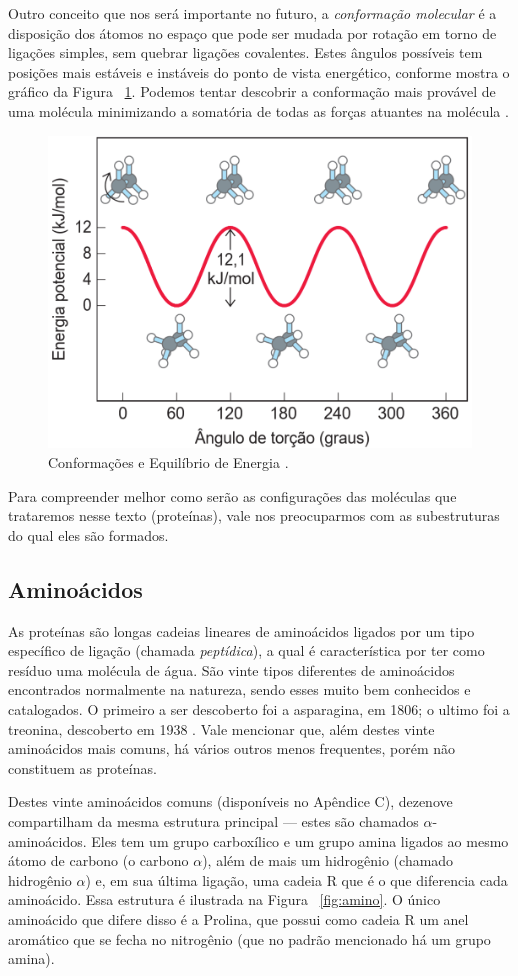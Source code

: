 \documentclass[a4paper,12pt]{article}
\begin{document}
	 Outro conceito que nos será importante no futuro, a \textit{conformação molecular} é a disposição dos átomos no espaço que pode ser mudada por rotação em torno de ligações simples, sem quebrar ligações covalentes. Estes ângulos possíveis tem posições mais estáveis e instáveis do ponto de vista energético, conforme mostra o gráfico da Figura ~\ref{fig:carener}. Podemos tentar descobrir a conformação mais provável de uma molécula minimizando a somatória de todas as forças atuantes na molécula \cite{carlileTese}. 
	
	\begin{figure}[H]
		\begin{center}
			\includegraphics[width=0.55\linewidth]{carbonoenergia.png}
		\end{center}
		\caption{Conformações e Equilíbrio de Energia \cite{bioquimicaLehninger}.}
		\label{fig:carener}
	\end{figure} 
	
	Para compreender melhor como serão as configurações das moléculas que trataremos nesse texto (proteínas), vale nos preocuparmos com as subestruturas do qual eles são formados. 
	
	\subsection{Aminoácidos}
	As proteínas são longas cadeias lineares de aminoácidos ligados por um tipo específico de ligação (chamada \textit{peptídica}), a qual é característica por ter como resíduo uma molécula de água. São vinte tipos diferentes de aminoácidos encontrados normalmente na natureza, sendo esses muito bem conhecidos e catalogados. O primeiro a ser descoberto foi a asparagina, em 1806; o ultimo foi a treonina, descoberto em 1938 \cite{bioquimicaLehninger}. Vale mencionar que, além destes vinte aminoácidos mais comuns, há vários outros menos frequentes, porém não constituem as proteínas.
	
	Destes vinte aminoácidos comuns (disponíveis no Apêndice C), dezenove compartilham da mesma estrutura principal \cite{fidalgotese} --- estes são chamados $\alpha$-aminoácidos. Eles tem um grupo carboxílico e um grupo amina ligados ao mesmo átomo de carbono (o carbono $\alpha$), além de mais um hidrogênio (chamado hidrogênio $\alpha$) e, em sua última ligação, uma cadeia R que é o que diferencia cada aminoácido. Essa estrutura é ilustrada na Figura ~\ref{fig:amino}. O único aminoácido que difere disso é a Prolina, que possui como cadeia R um anel aromático que se fecha no nitrogênio (que no padrão mencionado há um grupo amina).
	
\end{document}
